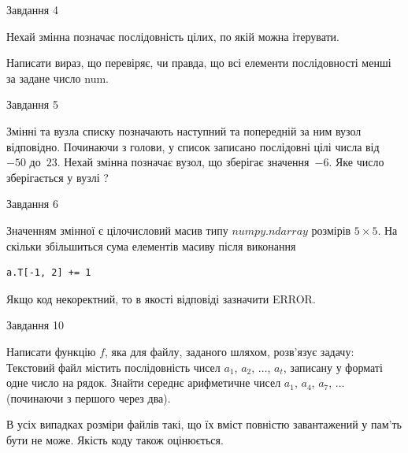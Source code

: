\documentclass[12pt, ukrainian]{article}
\begin{document}
{\begin{minipage}[t]{8.0cm}
\end{minipage}


               
{\begin{center}Завдання {4}\end{center}}
\vspace{-4mm}
Нехай змінна  позначає послідовність цілих, по якій можна ітерувати.

Написати вираз, що перевіряє, чи правда, що всі елементи послідовності менші за задане число num.\par

\vspace{10mm}
               
{\begin{center}Завдання {5}\end{center}}
\vspace{-4mm}
Змінні  та  вузла списку позначають наступний та попередній за ним вузол відповідно. Починаючи з голови, у список записано послідовні цілі числа від~$-50$ до~$23$. Нехай змінна  позначає вузол, що зберігає значення~$-6$.
Яке число зберігається у вузлі  ?\par

               
{\begin{center}Завдання {6}\end{center}}
\vspace{-4mm}
Значенням змінної  є цілочисловий масив типу $numpy.ndarray$ розмірів $5{\times}5$. На скільки збільшиться сума елементів масиву  після виконання
\begin{verbatim}
a.T[-1, 2] += 1
\end{verbatim}


Якщо код некоректний, то в якості відповіді зазначити ERROR.\par

               
{\begin{center}Завдання {10}\end{center}}
\vspace{-4mm}

Написати функцію $f$, яка для файлу, заданого шляхом, розв’язує задачу:\\ Текстовий файл містить послідовність чисел $a_1$, $a_2$, $\ldots$, $a_t$, записану у форматі одне число на рядок. Знайти середнє арифметичне чисел $a_1$, $a_4$, $a_7$, $\ldots$ (починаючи з першого через два).

В усіх випадках розміри файлів такі, що їх вміст повністю завантажений у пам'ть бути не може. Якість коду також оцінюється.



}
\end{document}
